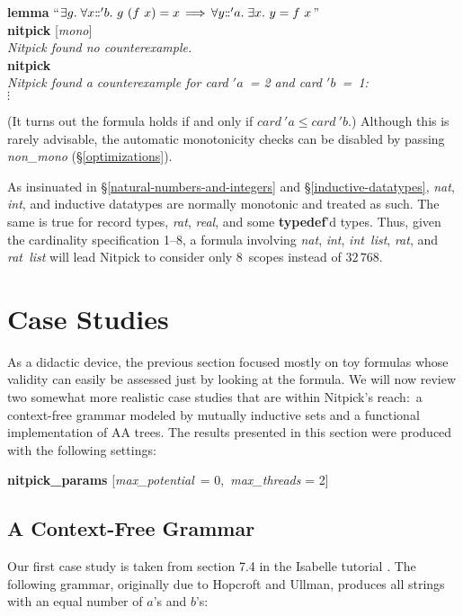 \documentclass[a4paper,12pt]{article}
\def\Colon{\mathord{:\mkern-1.5mu:}}
\begin{document}
\prew
\textbf{lemma} ``$\exists g.\; \forall x\Colon 'b.~g~(f~x) = x
 \,\Longrightarrow\, \forall y\Colon {'}a.\; \exists x.~y = f~x$'' \\
\textbf{nitpick} [\textit{mono}] \\[2\smallskipamount]
{\slshape Nitpick found no counterexample.} \\[2\smallskipamount]
\textbf{nitpick} \\[2\smallskipamount]
\slshape
Nitpick found a counterexample for \textit{card} $'a$~= 2 and \textit{card} $'b$~=~1: \\
\hbox{}\qquad $\vdots$
\postw

(It turns out the formula holds if and only if $\textit{card}~'a \le
\textit{card}~'b$.) Although this is rarely advisable, the automatic
monotonicity checks can be disabled by passing \textit{non\_mono}
(\S\ref{optimizations}).

As insinuated in \S\ref{natural-numbers-and-integers} and
\S\ref{inductive-datatypes}, \textit{nat}, \textit{int}, and inductive datatypes
are normally monotonic and treated as such. The same is true for record types,
\textit{rat}, \textit{real}, and some \textbf{typedef}'d types. Thus, given the
cardinality specification 1--8, a formula involving \textit{nat}, \textit{int},
\textit{int~list}, \textit{rat}, and \textit{rat~list} will lead Nitpick to
consider only 8~scopes instead of $32\,768$.

\section{Case Studies}
\label{case-studies}

As a didactic device, the previous section focused mostly on toy formulas whose
validity can easily be assessed just by looking at the formula. We will now
review two somewhat more realistic case studies that are within Nitpick's
reach:\ a context-free grammar modeled by mutually inductive sets and a
functional implementation of AA trees. The results presented in this
section were produced with the following settings:

\prew
\textbf{nitpick\_params} [\textit{max\_potential}~= 0,\, \textit{max\_threads} = 2]
\postw

\subsection{A Context-Free Grammar}
\label{a-context-free-grammar}

Our first case study is taken from section 7.4 in the Isabelle tutorial
\cite{isa-tutorial}. The following grammar, originally due to Hopcroft and
Ullman, produces all strings with an equal number of $a$'s and $b$'s:
\end{document}
